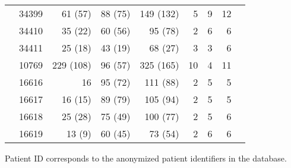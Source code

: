 \documentclass[12pt]{article}
\begin{document}
\begin{table*}
\begin{center}
\begin{tabular}{llrrrrrrr}
& 34399 & 61 (57) & 88 (75) & 149 (132) & 5 & 9 & 12 \\
& 34410 & 35 (22) & 60 (56) & 95 (78) & 2 & 6 & 6 \\
& 34411 & 25 (18) & 43 (19) & 68 (27) & 3 & 3 & 6 \\
\cite{Fischer04} & 10769 & 229 (108) & 96 (57) & 325 (165) & 10 & 4 & 11 \\ 
\cite{Llewellyn06} & 16616 & 16 & 95 (72) & 111 (88) & 2 & 5 & 5 \\
& 16617 & 16 (15) & 89 (79) & 105 (94) & 2 & 5 & 5 \\
& 16618 & 25 (28) & 75 (49) & 100 (77) & 2 & 5 & 6 \\
& 16619 & 13 (9) & 60 (45) & 73 (54) & 2 & 6 & 6 \\
\hline
\end{tabular}
\end{center}
   Patient ID corresponds to the anonymized patient identifiers in the database.
\end{table*}

\pagebreak{}
\end{document}
